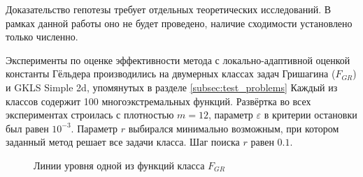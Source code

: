 Доказательство гепотезы требует отдельных теоретических исследований. В рамках данной
работы оно не будет проведено, наличие сходимости установлено только численно.

Эксперименты по оценке эффективности метода с локально-адаптивной оценкой константы
Гёльдера производились на двумерных классах задач Гришагина (\(F_{GR}\))
и GKLS Simple 2d, упомянутых в разделе \ref{subsec:test_problems}
Каждый из классов содержит 100 многоэкстремальных функций. Развёртка во всех экспериментах
строилась с плотностью \(m=12\), параметр \(\varepsilon\) в критерии остановки был равен \(10^{-3}\).
Параметр \(r\) выбирался минимально возможным, при котором заданный метод решает все
задачи класса. Шаг поиска \(r\) равен \(0.1\).

\begin{figure}[ht]
    \centering
    \qquad
    \caption{Линии уровня одной из функций класса \(F_{GR}\)}
    \label{fig:grish_isolines}
\end{figure}


